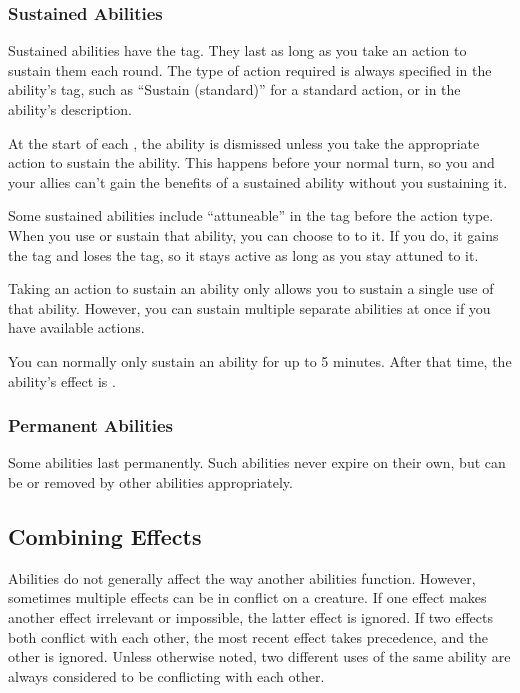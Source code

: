         \subsubsection{Sustained Abilities}\label{Sustained Abilities}
            Sustained abilities have the  tag.
            They last as long as you take an action to sustain them each round.
            The type of action required is always specified in the ability's tag, such as ``Sustain (standard)'' for a standard action, or in the ability's description.

            At the start of each , the ability is dismissed unless you take the appropriate action to sustain the ability.
            This happens before your normal turn, so you and your allies can't gain the benefits of a sustained ability without you sustaining it.

            Some sustained abilities include ``attuneable'' in the tag before the action type.
            When you use or sustain that ability, you can choose to  to it.
            If you do, it gains the  tag and loses the  tag, so it stays active as long as you stay attuned to it.

            Taking an action to sustain an ability only allows you to sustain a single use of that ability.
            However, you can sustain multiple separate abilities at once if you have available actions.

            You can normally only sustain an ability for up to 5 minutes.
            After that time, the ability's effect is .

        \subsubsection{Permanent Abilities}
            Some abilities last permanently.
            Such abilities never expire on their own, but can be  or removed by other abilities appropriately.

    \subsection{Combining Effects}
        Abilities do not generally affect the way another abilities function.
        However, sometimes multiple effects can be in conflict on a creature.
        If one effect makes another effect irrelevant or impossible, the latter effect is ignored.
        If two effects both conflict with each other, the most recent effect takes precedence, and the other is ignored.
        Unless otherwise noted, two different uses of the same ability are always considered to be conflicting with each other.

